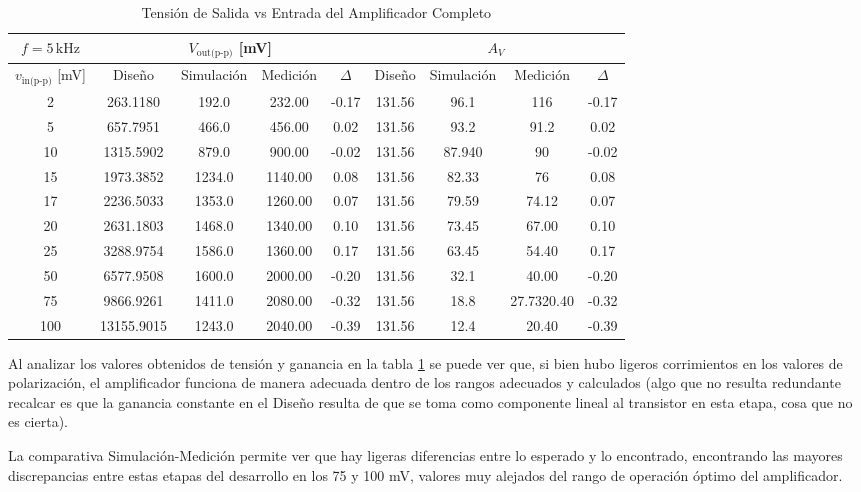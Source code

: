 \begin{table}[H]
  \centering
  \begin{tabular}{|c|c|c|c|c|c|c|c|c|}
    \hline
    $f = 5\,\text{kHz}$ & \multicolumn{4}{c|}{$V_{\text{out(p-p)}}$ [mV]} & \multicolumn{4}{c|}{$A_V$} \\ \hline
    $v_{\text{in(p-p)}}$ [mV] & Diseño & Simulación & Medición & $\Delta$ & Diseño & Simulación & Medición & $\Delta$ \\ \hline
    2   & 263.1180  & 192.0  & 232.00  &-0.17 & 131.56 & 96.1   & 116& -0.17 \\ \hline
    5   & 657.7951  & 466.0  & 456.00  &0.02& 131.56 & 93.2   & 91.2& 0.02 \\ \hline
    10  & 1315.5902 & 879.0  & 900.00 &-0.02 & 131.56 & 87.940 & 90&  -0.02 \\ \hline
    15  & 1973.3852 & 1234.0 & 1140.00 & 0.08& 131.56 & 82.33  & 76&  0.08\\ \hline
    17  & 2236.5033 & 1353.0 & 1260.00 &0.07 & 131.56 & 79.59  & 74.12& 0.07\\ \hline
    20  & 2631.1803 & 1468.0 & 1340.00 &0.10 & 131.56 & 73.45  & 67.00& 0.10\\ \hline
    25  & 3288.9754 & 1586.0 & 1360.00 &0.17& 131.56 & 63.45  & 54.40&0.17 \\ \hline
    50  & 6577.9508 & 1600.0 & 2000.00 &-0.20 & 131.56 & 32.1   & 40.00& -0.20\\ \hline
    75  & 9866.9261 & 1411.0 & 2080.00 &-0.32& 131.56 & 18.8   & 27.7320.40 &-0.32 \\ \hline
    100 & 13155.9015& 1243.0 & 2040.00 &-0.39 & 131.56 & 12.4   & 20.40 & -0.39\\ \hline
  \end{tabular}
  \caption{Tensión de Salida vs Entrada del Amplificador Completo}
  \label{tensionGain}
\end{table}

Al analizar los valores obtenidos de tensión y ganancia en la tabla \ref{tensionGain} se puede ver que, si bien hubo ligeros corrimientos en los valores de polarización, el amplificador funciona de manera adecuada dentro de los rangos adecuados y calculados (algo que no resulta redundante recalcar es que la ganancia constante en el Diseño resulta de que se toma como componente lineal al transistor en esta etapa, cosa que no es cierta).

La comparativa Simulación-Medición permite ver que hay ligeras diferencias entre lo esperado y lo encontrado, encontrando las mayores discrepancias entre estas etapas del desarrollo en los 75 y 100 mV, valores muy alejados del rango de operación óptimo del amplificador.

